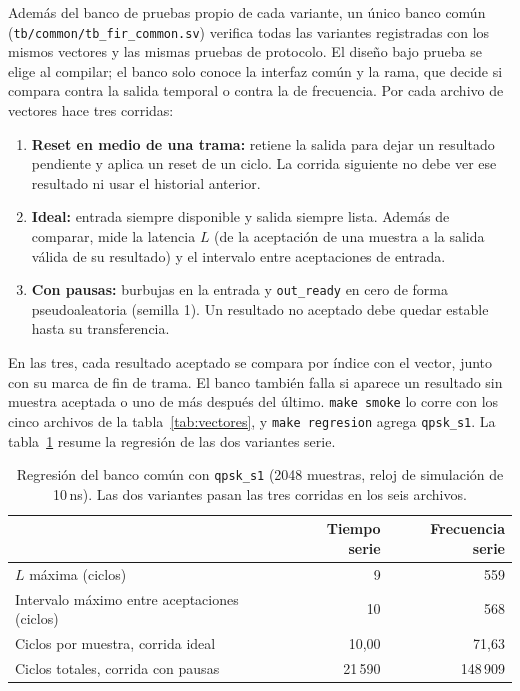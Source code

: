 Además del banco de pruebas propio de cada variante, un único banco común (\texttt{tb/\allowbreak common/\allowbreak tb\_fir\_common.sv}) verifica todas las variantes registradas con los mismos vectores y las mismas pruebas de protocolo. El diseño bajo prueba se elige al compilar; el banco solo conoce la interfaz común y la rama, que decide si compara contra la salida temporal o contra la de frecuencia. Por cada archivo de vectores hace tres corridas:

\begin{enumerate}
  \item \textbf{Reset en medio de una trama:} retiene la salida para dejar un resultado pendiente y aplica un reset de un ciclo. La corrida siguiente no debe ver ese resultado ni usar el historial anterior.
  \item \textbf{Ideal:} entrada siempre disponible y salida siempre lista. Además de comparar, mide la latencia $L$ (de la aceptación de una muestra a la salida válida de su resultado) y el intervalo entre aceptaciones de entrada.
  \item \textbf{Con pausas:} burbujas en la entrada y \texttt{out\_ready} en cero de forma pseudoaleatoria (semilla 1). Un resultado no aceptado debe quedar estable hasta su transferencia.
\end{enumerate}

En las tres, cada resultado aceptado se compara por índice con el vector, junto con su marca de fin de trama. El banco también falla si aparece un resultado sin muestra aceptada o uno de más después del último. \texttt{make smoke} lo corre con los cinco archivos de la tabla~\ref{tab:vectores}, y \texttt{make regresion} agrega \texttt{qpsk\_s1}. La tabla~\ref{tab:banco} resume la regresión de las dos variantes serie.

\begin{table}[h]
  \centering
  \caption{Regresión del banco común con \texttt{qpsk\_s1} (2048 muestras, reloj de simulación de 10\,ns). Las dos variantes pasan las tres corridas en los seis archivos.}\label{tab:banco}
  \begin{tabular}{lrr}
    \toprule
    & Tiempo serie & Frecuencia serie \\
    \midrule
    $L$ máxima (ciclos) & 9 & 559 \\
    Intervalo máximo entre aceptaciones (ciclos) & 10 & 568 \\
    Ciclos por muestra, corrida ideal & 10,00 & 71,63 \\
    Ciclos totales, corrida con pausas & 21\,590 & 148\,909 \\
    \bottomrule
  \end{tabular}
\end{table}

